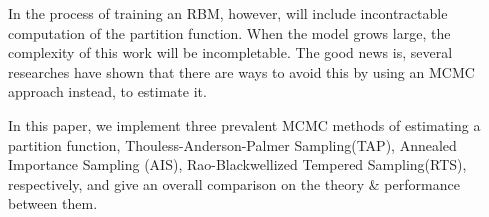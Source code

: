 In the process of training an RBM, however, will include incontractable computation of the partition function. When the model grows large, the complexity of this work will be incompletable. The good news is, several researches have shown that there are ways to avoid this by using an MCMC approach instead, to estimate it.

In this paper, we implement three prevalent MCMC methods of estimating a partition function, Thouless-Anderson-Palmer Sampling(TAP)\cite{gabrie2015training}, Annealed Importance Sampling (AIS)\cite{neal2001annealed,salakhutdinov2009learning}, Rao-Blackwellized Tempered Sampling(RTS)\cite{carlson2016partition}, respectively, and give an overall comparison on the theory \& performance between them.




